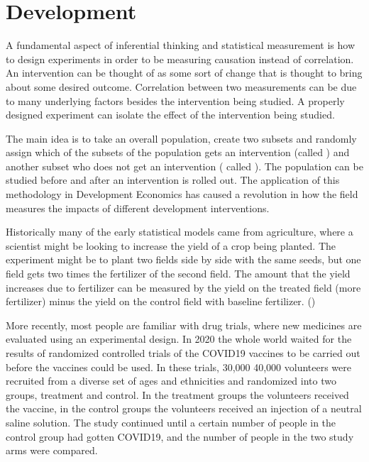 \documentclass[letterpaper,10pt,english]{jupyterBook}
\begin{document}
\section{Development}
\label{\detokenize{content/08-development/index:development}}\label{\detokenize{content/08-development/index::doc}}
\sphinxAtStartPar
A fundamental aspect of inferential thinking and statistical measurement is how to design experiments in order to be measuring causation instead of correlation. An intervention can be thought of as some sort of change that is thought to bring about some desired outcome.   Correlation between two measurements can be due to many underlying factors besides the intervention being studied.  A properly designed experiment can isolate the effect of the intervention being studied.

\sphinxAtStartPar
The main idea is to take an overall population, create two subsets and randomly assign which of the subsets of the population gets an intervention (called ) and another subset who does not get an intervention ( called ).  The population can be studied before and after an intervention is rolled out. The application of this methodology in Development Economics has caused a revolution in how the field measures the impacts of different development interventions.

\sphinxAtStartPar
Historically many of the early statistical models came from agriculture, where a scientist might be looking to increase the yield of a crop being planted. The experiment might be to plant two fields side by side with the same seeds, but one field gets two times the fertilizer of the second field. The amount that the yield increases due to fertilizer can be measured by the yield on the treated field (more fertilizer) minus the yield on the control field with baseline fertilizer.  ()

\sphinxAtStartPar
More recently, most people are familiar with drug trials, where new medicines are evaluated using an experimental design. In 2020 the whole world waited for the results of randomized controlled trials of the COVID\sphinxhyphen{}19 vaccines to be carried out before the vaccines could be used.  In these trials, 30,000 \sphinxhyphen{} 40,000 volunteers were recruited from a diverse set of ages and ethnicities and randomized into two groups, treatment and control. In the treatment groups the volunteers received the vaccine, in the control groups the volunteers received an injection of a neutral saline solution.  The study continued until a certain number of people in the control group had gotten COVID\sphinxhyphen{}19, and the number of people in the two study arms were compared.
\end{document}
